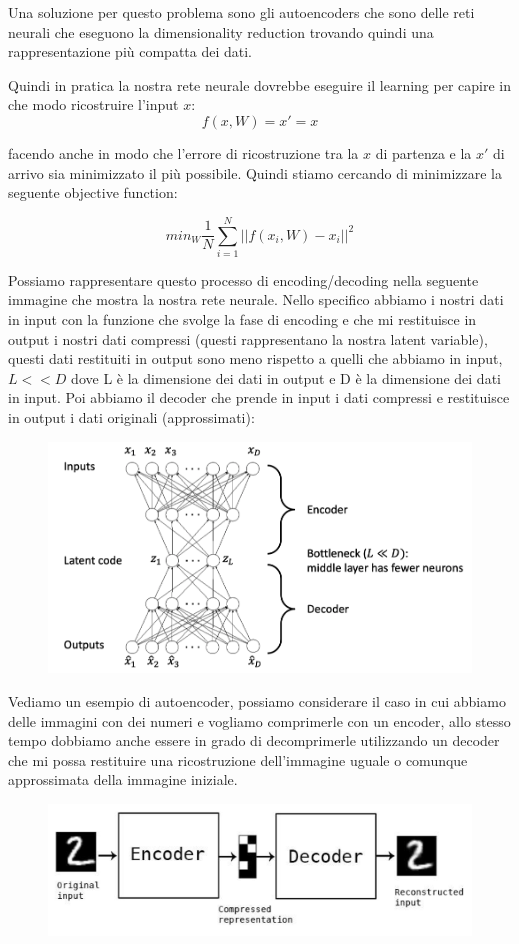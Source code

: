 \documentclass[14pt]{extreport}
\begin{document}
Una soluzione per questo problema sono gli autoencoders che sono delle reti neurali che eseguono la dimensionality reduction trovando quindi una 
rappresentazione più compatta dei dati.

Quindi in pratica la nostra rete neurale dovrebbe eseguire il learning per capire in che modo ricostruire l'input $x$:
$$f(x,W) = x' = x$$

facendo anche in modo che l'errore di ricostruzione tra la $x$ di partenza e la $x'$ di arrivo sia minimizzato il più possibile.
Quindi stiamo cercando di minimizzare la seguente objective function:

$$min_W \frac{1}{N} \sum_{i=1}^N ||f(x_i, W)-x_i||^2$$

Possiamo rappresentare questo processo di encoding/decoding nella seguente immagine che mostra la nostra rete neurale.
Nello specifico abbiamo i nostri dati in input con la funzione che svolge la fase di encoding e che mi restituisce in output i nostri dati 
compressi (questi rappresentano la nostra latent variable), 
questi dati restituiti in output sono meno rispetto a quelli che abbiamo in input, $L << D$ dove L è la dimensione dei dati in output e D è la dimensione
dei dati in input.
Poi abbiamo il decoder che prende in input i dati compressi e restituisce in output i dati originali (approssimati):

\begin{figure}[H] 
\centering
\includegraphics[width=0.7\linewidth]{533.jpeg}
\end{figure}

Vediamo un esempio di autoencoder, possiamo considerare il caso in cui abbiamo delle immagini con dei numeri e vogliamo comprimerle con un encoder, allo stesso
tempo dobbiamo anche essere in grado di decomprimerle utilizzando un decoder che mi possa restituire una ricostruzione dell'immagine uguale o comunque approssimata 
della immagine iniziale.


\begin{figure}[H] 
\centering
\includegraphics[width=0.7\linewidth]{534.jpeg}
\end{figure}
\end{document}
